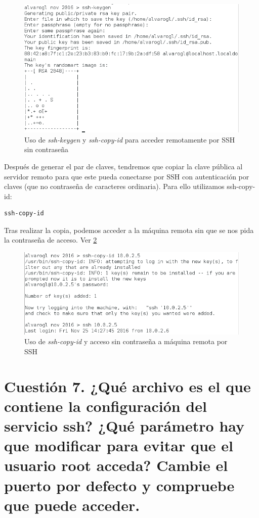\begin{figure}[H]
	\centering
	\includegraphics[scale=0.6]{ise9.png}
	\caption{Uso de \textit{ssh-keygen} y \textit{ssh-copy-id} para acceder remotamente por SSH sin contraseña} \label{ise9}
\end{figure}

Después de generar el par de claves, tendremos que copiar la clave pública al servidor remoto para que este pueda conectarse por SSH con autenticación por claves (que no contraseña de caracteres ordinaria). Para ello utilizamos ssh-copy-id:

\begin{verbatim}
ssh-copy-id  
\end{verbatim}

Tras realizar la copia, podemos acceder a la máquina remota sin que se nos pida la contraseña de acceso. Ver \ref{ise10}

\begin{figure}[H]
	\centering
	\includegraphics[scale=0.6]{ise10.png}
	\caption{Uso de \textit{ssh-copy-id} y acceso sin contraseña a máquina remota por SSH} \label{ise10}
\end{figure}

\section{Cuestión 7. ¿Qué archivo es el que contiene la configuración del servicio ssh? ¿Qué parámetro hay que modificar para evitar que el usuario root acceda? Cambie el puerto por defecto y compruebe que puede acceder.}

